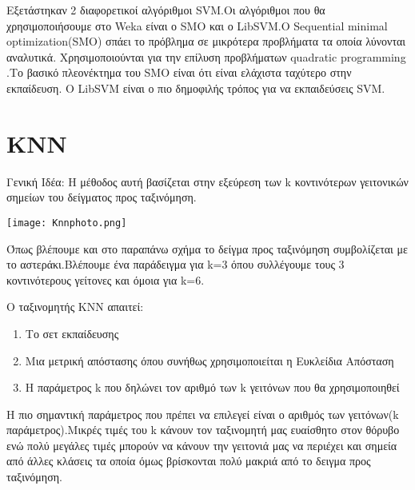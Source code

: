 Εξετάστηκαν 2 διαφορετικοί αλγόριθμοι SVM.Οι αλγόριθμοι που θα χρησιμοποιήσουμε στο Weka είναι ο SMO και ο LibSVM.O Sequential minimal optimization(SMO) σπάει το πρόβλημα σε μικρότερα προβλήματα τα οποία λύνονται αναλυτικά. Χρησιμοποιούνται για την επίλυση προβλήματων quadratic programming .Το βασικό πλεονέκτημα του SMO είναι ότι είναι ελάχιστα ταχύτερο στην εκπαίδευση. O LibSVM είναι ο πιο δημοφιλής τρόπος για να εκπαιδεύσεις SVM.



 
\section{KNN}

Γενική Ιδέα: Η μέθοδος αυτή βασίζεται στην εξεύρεση των k κοντινότερων γειτονικών σημείων του δείγματος προς ταξινόμηση.

\begin{center}
	\texttt{[image: Knnphoto.png]}
	\label{fig:KNN}  
\end{center}

Όπως βλέπουμε και στο παραπάνω σχήμα το δείγμα προς ταξινόμηση συμβολίζεται με το αστεράκι.Βλέπουμε ένα παράδειγμα για k=3 όπου συλλέγουμε τους 3 κοντινότερους γείτονες και όμοια για k=6.

Ο ταξινομητής ΚΝΝ απαιτεί:
\begin{enumerate}
	\item Το σετ εκπαίδευσης
	\item Μια μετρική απόστασης όπου συνήθως χρησιμοποιείται η Ευκλείδια Απόσταση
	\item Η παράμετρος k που δηλώνει τον αριθμό των k γειτόνων που θα χρησιμοποιηθεί
\end{enumerate}

Η πιο σημαντική παράμετρος που πρέπει να επιλεγεί είναι ο αριθμός των γειτόνων(k παράμετρος).Μικρές τιμές του k κάνουν τον ταξινομητή μας ευαίσθητο στον θόρυβο ενώ πολύ μεγάλες τιμές μπορούν να κάνουν την γειτονιά μας να περιέχει και σημεία από άλλες κλάσεις τα οποία όμως βρίσκονται πολύ μακριά από το δειγμα προς ταξινόμηση.



